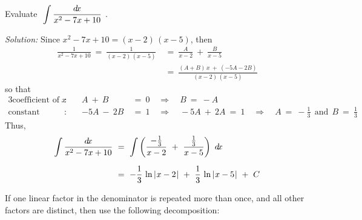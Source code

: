 \begin{exmp}\label{exmp:partfrac1}
\noindent Evaluate $~\displaystyle\int \frac{d\!x}{x^2 - 7x + 10}~$.\vspace{1mm}
\par\noindent\emph{Solution:} Since $x^2 - 7x + 10 = (x-2)\,(x-5)$, then
\begin{align*}
\frac{1}{x^2 - 7x + 10} ~=~ \frac{1}{(x-2)\,(x-5)} ~&=~ \frac{A}{x-2} ~+~ \frac{B}{x-5}\\[4pt]
&=~ \frac{(A+B)\,x ~+~ (-5A - 2B)}{(x-2)\,(x-5)}
\end{align*}
so that
\begin{alignat*}{3}
\text{coefficient of $x$}&: \quad & A ~+~ B ~&=~ 0 \quad\Rightarrow\quad B ~=~ -A\\
\text{constant term}&: & -5A ~-~ 2B ~&=~ 1 \quad\Rightarrow\quad -5A ~+~ 2A ~=~ 1
 \quad\Rightarrow\quad A ~=~ -\frac{1}{3} ~~\text{and}~~ B ~=~ \frac{1}{3}
\end{alignat*}
Thus,
\begin{align*}
\int \frac{d\!x}{x^2 - 7x + 10} ~&=~ \int \left(\frac{-\frac{1}{3}}{x-2} ~+~
\frac{\frac{1}{3}}{x-5} \right)~d\!x\\[6pt]
&=~ -\frac{1}{3}\,\ln\,\lvert\mspace{1mu}x-2\mspace{1mu}\rvert ~+~ \frac{1}{3}\,\ln\,\lvert\mspace{1mu}x-5\mspace{1mu}\rvert ~+~ C
\end{align*}
\end{exmp}
\divider
\newpage
If one linear factor in the denominator is repeated more than once, and all
other factors are distinct, then use the following decomposition:


